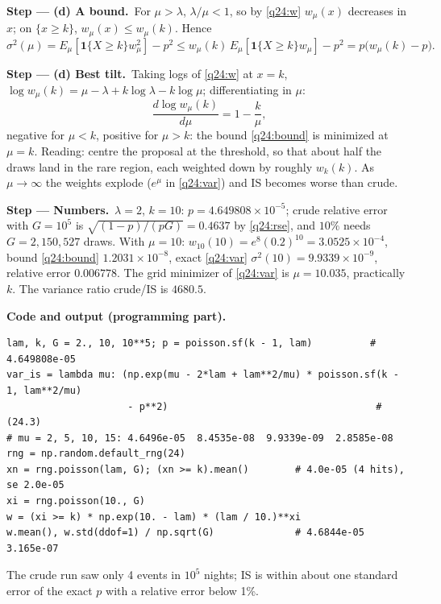 \documentclass[11pt,a4paper]{article}
\numberwithin{equation}{questao}   %
\newcommand{\passo}[2]{\par\smallskip\noindent\textbf{Step --- #1.}~#2}
\newcommand{\codehead}{\par\smallskip\noindent\textbf{Code and output (programming part).}\par}
\newcommand{\1}{\mathbf{1}}
\begin{document}
\begin{sol}
\passo{(d) A bound}{For $\mu>\lambda$, $\lambda/\mu<1$, so by \eqref{q24:w} $w_\mu(x)$ decreases in
$x$; on $\{x\ge k\}$, $w_\mu(x)\le w_\mu(k)$. Hence}
\begin{equation}\label{q24:bound}
\sigma^2(\mu)=E_\mu[\1\{X\ge k\}w_\mu^2]-p^2\le w_\mu(k)\,E_\mu[\1\{X\ge k\}w_\mu]-p^2=p\big(w_\mu(k)-p\big).
\end{equation}

\passo{(d) Best tilt}{Taking logs of \eqref{q24:w} at $x=k$, $\log w_\mu(k)=\mu-\lambda+k\log\lambda-k\log\mu$;
differentiating in $\mu$:}
\[
\frac{d\log w_\mu(k)}{d\mu}=1-\frac k\mu,
\]
negative for $\mu<k$, positive for $\mu>k$: the bound \eqref{q24:bound} is minimized at $\mu=k$.
Reading: centre the proposal at the threshold, so that about half the draws land in the rare region,
each weighted down by roughly $w_k(k)$. As $\mu\to\infty$ the weights explode
($e^{\mu}$ in \eqref{q24:var}) and IS becomes worse than crude.

\passo{Numbers}{$\lambda=2$, $k=10$: $p=4.649808\times10^{-5}$; crude relative error with $G=10^5$
is $\sqrt{(1-p)/(pG)}=0.4637$ by \eqref{q24:rse}, and $10\%$ needs $G=2{,}150{,}527$ draws. With $\mu=10$:
$w_{10}(10)=e^{8}(0.2)^{10}=3.0525\times10^{-4}$, bound \eqref{q24:bound} $1.2031\times10^{-8}$, exact
\eqref{q24:var} $\sigma^2(10)=9.9339\times10^{-9}$, relative error $0.006778$. The grid minimizer of
\eqref{q24:var} is $\mu=10.035$, practically $k$. The variance ratio crude/IS is $4680.5$.}

\codehead
{\small
\begin{verbatim}
lam, k, G = 2., 10, 10**5; p = poisson.sf(k - 1, lam)          # 4.649808e-05
var_is = lambda mu: (np.exp(mu - 2*lam + lam**2/mu) * poisson.sf(k - 1, lam**2/mu)
                     - p**2)                                    # (24.3)
# mu = 2, 5, 10, 15: 4.6496e-05  8.4535e-08  9.9339e-09  2.8585e-08
rng = np.random.default_rng(24)
xn = rng.poisson(lam, G); (xn >= k).mean()        # 4.0e-05 (4 hits), se 2.0e-05
xi = rng.poisson(10., G)
w = (xi >= k) * np.exp(10. - lam) * (lam / 10.)**xi
w.mean(), w.std(ddof=1) / np.sqrt(G)              # 4.6844e-05  3.165e-07
\end{verbatim}
}
The crude run saw only 4 events in $10^5$ nights; IS is within about one standard error of the exact
$p$ with a relative error below 1\%.


\end{sol}
\end{document}

